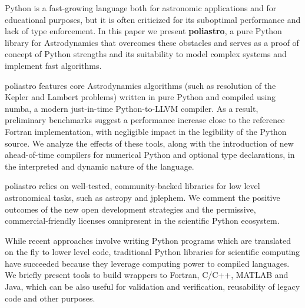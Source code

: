 Python is a fast-growing language both for astronomic applications\cite{2015arXiv150703989M} and for educational purposes\cite{guo2014python}, but it is often criticized for its suboptimal performance and lack of type enforcement. In this paper we present \textbf{poliastro}, a pure Python library for Astrodynamics that overcomes these obstacles and serves as a proof of concept of Python strengths and its suitability to model complex systems and implement fast algorithms.

poliastro features core Astrodynamics algorithms (such as resolution of the Kepler and Lambert problems) written in pure Python and compiled using numba, a modern just-in-time Python-to-LLVM compiler. As a result, preliminary benchmarks suggest a performance increase close to the reference Fortran implementation, with negligible impact in the legibility of the Python source. We analyze the effects of these tools, along with the introduction of new ahead-of-time compilers for numerical Python and optional type declarations, in the interpreted and dynamic nature of the language.

poliastro relies on well-tested, community-backed libraries for low level astronomical tasks, such as astropy\cite{Robitaille_2013} and jplephem. We comment the positive outcomes of the new open development strategies and the permissive, commercial-friendly licenses omnipresent in the scientific Python ecosystem.

While recent approaches involve writing Python programs which are translated on the fly to lower level code, traditional Python libraries for scientific computing have succeeded because they leverage computing power to compiled languages. We briefly present tools to build wrappers to Fortran, C/C++, MATLAB and Java, which can be also useful for validation and verification, reusability of legacy code and other purposes.